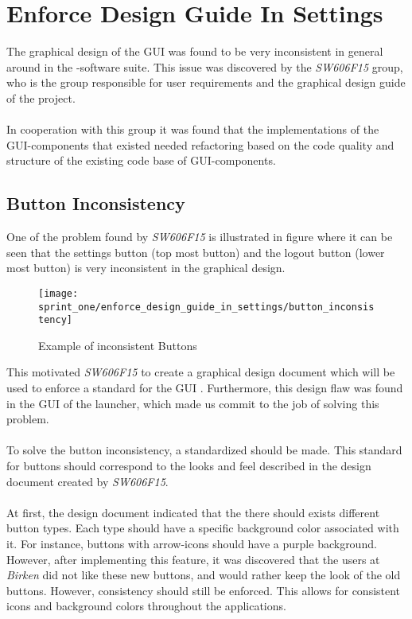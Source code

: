 \section{Enforce Design Guide In Settings}
\label{sec:enforce_design_guide_in_settings}

The graphical design of the GUI was found to be very inconsistent in general around in the \giraf-software suite. This issue was discovered by the \emph{SW606F15} group, who is the group responsible for user requirements and the graphical design guide of the project.
\\\\
In cooperation with this group it was found that the implementations of the GUI-components that existed needed refactoring based on the code quality and structure of the existing code base of GUI-components.

\subsection{Button Inconsistency}
\label{sub:button_inconsistency}
One of the problem found by \emph{SW606F15} is illustrated in figure  where it can be seen that the settings button (top most button) and the logout button (lower most button) is very inconsistent in the graphical design. 

\begin{figure}[!htbp]
    \centering
    \texttt{[image: sprint\_one/enforce\_design\_guide\_in\_settings/button\_inconsistency]}
    \caption{Example of inconsistent Buttons}
    \label{fig:button_inconsistency}
\end{figure}

This motivated \emph{SW606F15} to create a graphical design document which will be used to enforce a standard for the GUI . Furthermore, this design flaw was found in the GUI of the launcher, which made us commit to the job of solving this problem. 
\\\\
To solve the button inconsistency, a standardized should be made. This standard for buttons should correspond to the looks and feel described in the design document created by \emph{SW606F15}. 
\\\\
At first, the design document indicated that the there should exists different button types. Each type should have a specific background color associated with it. For instance, buttons with arrow-icons should have a purple background. However, after implementing this feature, it was discovered that the users at \emph{Birken} did not like these new buttons, and would rather keep the look of the old buttons. However, consistency should still be enforced. This allows for consistent icons and background colors throughout the applications. 

